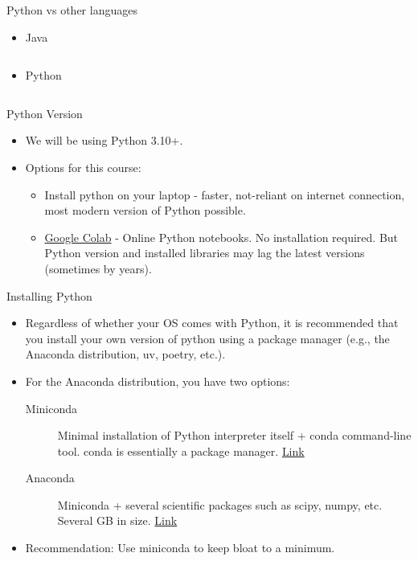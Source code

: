 \documentclass[aspectratio=169]{beamer}
\begin{document}
    \begin{frame}[fragile]{Python vs other languages}
        \begin{itemize}
            \item Java
            \inputminted{java}{example_hello_world_java.java}
            \item Python
            \inputminted{python}{example_hello_world_python.py}
        \end{itemize}
    \end{frame}

    \begin{frame}{Python Version}
        \begin{itemize}
            \item We will be using Python 3.10+.
            \item Options for this course:
            \begin{itemize}
                \item Install python on your laptop - faster, not-reliant on internet connection, most modern version of Python possible.
                \item \href{https://colab.research.google.com/}{Google Colab} - Online Python notebooks. No installation required. But Python version and installed libraries may lag the latest versions (sometimes by years).
            \end{itemize}
        \end{itemize}
    \end{frame}


    \begin{frame}{Installing Python}
        \begin{itemize}
            \item Regardless of whether your OS comes with Python, it is recommended that you install your own version of python using a package manager (e.g., the Anaconda distribution, uv, poetry, etc.).
            \item For the Anaconda distribution, you have two options:
            \begin{description}
                \item[Miniconda] Minimal installation of Python interpreter itself + conda command-line tool. conda is essentially a package manager. \href{https://docs.conda.io/en/latest/miniconda.html}{Link}
                \item[Anaconda] Miniconda + several scientific packages such as scipy, numpy, etc. Several GB in size. \href{https://www.anaconda.com/distribution/}{Link}
            \end{description}
            \item Recommendation: Use miniconda to keep bloat to a minimum.
        \end{itemize}
    \end{frame}
\end{document}
